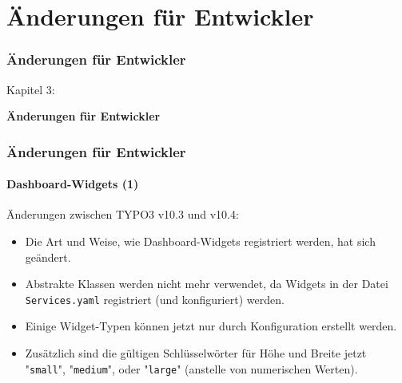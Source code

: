 %

\section{Änderungen für Entwickler}
\begin{frame}[fragile]
	\frametitle{Änderungen für Entwickler}

	\begin{center}\huge{Kapitel 3:}\end{center}
	\begin{center}\huge{\color{typo3darkgrey}\textbf{Änderungen für Entwickler}}\end{center}

\end{frame}


\begin{frame}[fragile]
	\frametitle{Änderungen für Entwickler}
	\framesubtitle{Dashboard-Widgets (1)}

	Änderungen zwischen TYPO3 v10.3 und v10.4:

	\begin{itemize}
		\item Die Art und Weise, wie Dashboard-Widgets registriert werden, hat sich geändert.
		\item Abstrakte Klassen werden nicht mehr verwendet, da Widgets in der Datei
			\texttt{Services.yaml} registriert (und konfiguriert) werden.
		\item Einige Widget-Typen können jetzt nur durch Konfiguration erstellt werden.
		\item Zusätzlich sind die gültigen Schlüsselwörter für Höhe und Breite jetzt
			"\texttt{small}", "\texttt{medium}", oder "\texttt{large}"
			(anstelle von numerischen Werten).
	\end{itemize}

\end{frame}


